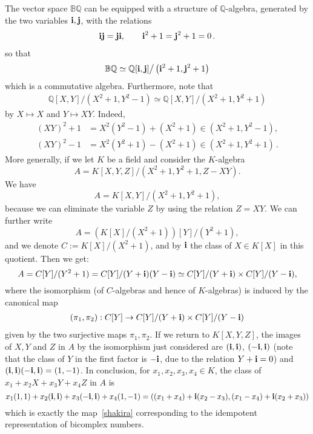 \documentclass[reqno]{amsart}
\theoremstyle{plain}
\theoremstyle{definition}
\theoremstyle{remark}
\numberwithin{equation}{section}
\begin{document}
The vector space ${{\mathbb B}{\mathbb Q}}$ can be equipped with a structure of
${{\mathbb Q}}$-algebra, generated by the two variables ${{\bf i}},{{\bf j}}$, with the
relations
\begin{align*}
  {{\bf i}}{{\bf j}} = {{\bf j}}{{\bf i}},\qquad {{\bf i}}^2+1 = {{\bf j}}^2+1 =0\,.
\end{align*}
so that
\begin{align*}
  {{\mathbb B}{\mathbb Q}} \simeq {{\mathbb Q}}[{{\bf i}},{{\bf j}}]\big/\left({{\bf i}}^2+1,{{\bf j}}^2+1\right)
\end{align*}
which is a commutative algebra.  Furthermore, note that
\begin{align*}
  {{\mathbb Q}}[X,Y]/(X^2+1,Y^2-1) \simeq {{\mathbb Q}}[X,Y]/(X^2+1,Y^2+1)
\end{align*}
by $X\mapsto X$ and $Y\mapsto XY$. Indeed,
\begin{align*}
  (XY)^2 + 1 &= X^2(Y^2-1) + (X^2+1)\in (X^2+1,Y^2-1),\\
  (XY)^2 - 1 &= X^2(Y^2+1) - (X^2+1)\in (X^2+1,Y^2+1)\,.
\end{align*}
More generally, if we let $K$ be a field and consider the $K$-algebra
\[
A= K[X,Y,Z]/(X^2+1, Y^2+1, Z-XY).
\]
We have
\[
A= K[X,Y]/(X^2+1, Y^2+1),
\]
because we can eliminate the variable $Z$ by using the relation
$Z= XY$. We can further write
\[
A= \left(K[X]/(X^2+1)\right)[Y]/(Y^2+1),
\]
and we denote $C:= K[X]/(X^2+1)$, and by ${{\bf i}}$ the class of
$X \in K[X]$ in this quotient. Then we get:
\[
A= C[Y]/(Y^2+1)= C[Y]/(Y+{{\bf i}})(Y-{{\bf i}})\simeq C[Y]/(Y+{{\bf i}}) \times C[Y]/(Y-{{\bf i}}),
\]
where the isomorphism (of $C$-algebras and hence of $K$-algebras) is
induced by the canonical map
\begin{align}
  \label{crucial}
  (\pi_1, \pi_2): C[Y]\to  C[Y]/(Y+{{\bf i}}) \times C[Y]/(Y-{{\bf i}})
\end{align}
given by the two surjective maps $\pi_1, \pi_2$.  If we return to
$K[X,Y,Z]$, the images of $ X,Y$ and $Z$ in $A$ by the isomorphism
just considered are $ ({{\bf i}},{{\bf i}}) $, $(-{{\bf i}},{{\bf i}})$ (note that the class of
$Y$ in the first factor is $-{{\bf i}}$, due to the relation $Y+{{\bf i}}= 0$) and
$({{\bf i}},{{\bf i}})(-{{\bf i}},{{\bf i}})= (1,-1) $.  In conclusion, for
$x_1,x_2,x_3,x_4 \in K$, the class of $x_1+x_2X+x_3Y+x_4Z$ in $A$ is
\[
x_1(1,1)+x_2({{\bf i}},{{\bf i}})+x_3(-{{\bf i}},{{\bf i}})+x_4(1,-1) = \left((x_1+x_4)
  +{{\bf i}}(x_2-x_3), (x_1-x_4) +{{\bf i}}(x_2+x_3) \right)
\]
which is exactly the map~\eqref{shakira} corresponding to the
idempotent representation of bicomplex numbers. 
\end{document}
